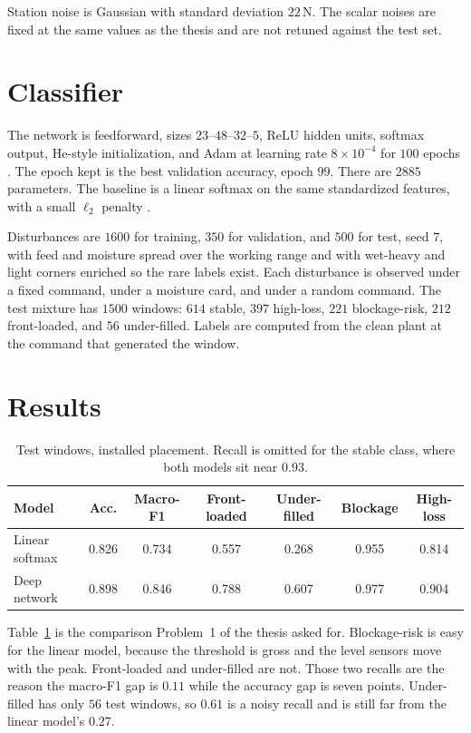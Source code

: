 \documentclass[11pt,a4paper]{article}
\begin{document}
Station noise is Gaussian with standard deviation \(22\,\mathrm{N}\). The scalar noises are fixed at the same values as the thesis and are not retuned against the test set.

\section{Classifier}

The network is feedforward, sizes \(23\)--\(48\)--\(32\)--\(5\), ReLU hidden units, softmax output, He-style initialization, and Adam at learning rate \(8\times 10^{-4}\) for \(100\) epochs \cite{he2015,kingma2015,goodfellow2016}. The epoch kept is the best validation accuracy, epoch \(99\). There are \(2885\) parameters. The baseline is a linear softmax on the same standardized features, with a small \(\ell_2\) penalty \cite{bishop2006}.

Disturbances are \(1600\) for training, \(350\) for validation, and \(500\) for test, seed \(7\), with feed and moisture spread over the working range and with wet-heavy and light corners enriched so the rare labels exist. Each disturbance is observed under a fixed command, under a moisture card, and under a random command. The test mixture has \(1500\) windows: \(614\) stable, \(397\) high-loss, \(221\) blockage-risk, \(212\) front-loaded, and \(56\) under-filled. Labels are computed from the clean plant at the command that generated the window.

\section{Results}

\begin{table}[ht]
\centering
\caption{Test windows, installed placement. Recall is omitted for the stable class, where both models sit near \(0.93\).}
\label{tab:status}
\begin{tabular}{@{}lcccccc@{}}
\toprule
Model & Acc. & Macro-F1 & Front-loaded & Under-filled & Blockage & High-loss \\
\midrule
Linear softmax & 0.826 & 0.734 & 0.557 & 0.268 & 0.955 & 0.814 \\
Deep network & 0.898 & 0.846 & 0.788 & 0.607 & 0.977 & 0.904 \\
\bottomrule
\end{tabular}
\end{table}

Table~\ref{tab:status} is the comparison Problem~1 of the thesis asked for. Blockage-risk is easy for the linear model, because the threshold is gross and the level sensors move with the peak. Front-loaded and under-filled are not. Those two recalls are the reason the macro-F1 gap is \(0.11\) while the accuracy gap is seven points. Under-filled has only \(56\) test windows, so \(0.61\) is a noisy recall and is still far from the linear model's \(0.27\).
\end{document}
